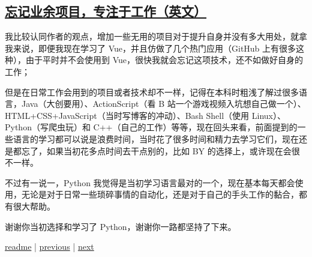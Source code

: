 \subsection{\href{https://manuel.darcemont.fr/posts/focus-on-jour-job/}{忘记业余项目，专注于工作（英文）}}

我比较认同作者的观点，增加一些无用的项目对于提升自身并没有多大用处，就拿我来说，即便我现在学习了 Vue，并且仿做了几个热门应用（GitHub 上有很多这种），由于平时并不会使用到 Vue，很快我就会忘记这项技术，还不如做好自身的工作；

但是在日常工作会用到的项目或者技术却不一样，记得在本科时粗浅了解过很多语言，Java（大创要用）、ActionScript（看 B 站一个游戏视频入坑想自己做一个）、HTML+CSS+JavaScript（当时写博客的冲动）、Bash Shell（使用 Linux）、Python（写爬虫玩）和 C++（自己的工作）等等，现在回头来看，前面提到的一些语言的学习都可以说是浪费时间，当时花了很多时间和精力去学习它们，现在还是都忘了，如果当初花多点时间去干点别的，比如 BY 的选择上，或许现在会很不一样。

不过有一说一，Python 我觉得是当初学习语言最对的一个，现在基本每天都会使用，无论是对于日常一些琐碎事情的自动化，还是对于自己的手头工作的黏合，都有很大帮助。

谢谢你当初选择和学习了 Python，谢谢你一路都坚持了下来。

\noindent \href{https://github.com/taseikyo/arts}{readme} | \hyperref[chap:w1]{previous} | \hyperref[chap:w3]{next}
